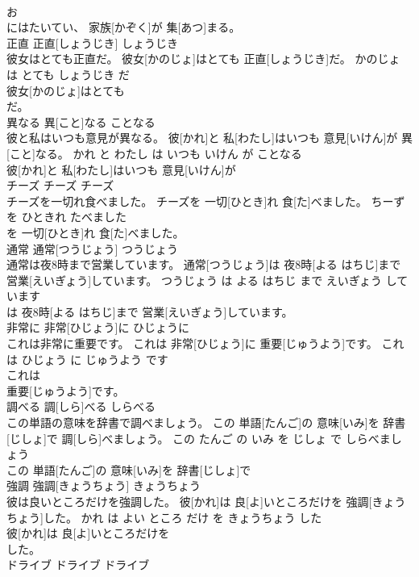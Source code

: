 \documentclass[8pt]{extreport}
\begin{document}
\begin{CJK}{UTF8}{min}
\\	お
\\	にはたいてい、 家族[かぞく]が 集[あつ]まる。		
\\	正直	正直[しょうじき]	しょうじき	
\\	彼女はとても正直だ。	彼女[かのじょ]はとても 正直[しょうじき]だ。	かのじょ は とても しょうじき だ	
\\	彼女[かのじょ]はとても
\\	だ。		
\\	異なる	異[こと]なる	ことなる	
\\	彼と私はいつも意見が異なる。	彼[かれ]と 私[わたし]はいつも 意見[いけん]が 異[こと]なる。	かれ と わたし は いつも いけん が ことなる	
\\	彼[かれ]と 私[わたし]はいつも 意見[いけん]が
\\	チーズ	チーズ	チーズ	
\\	チーズを一切れ食べました。	チーズを 一切[ひとき]れ 食[た]べました。	ちーず を ひときれ たべました	
\\	を 一切[ひとき]れ 食[た]べました。		
\\	通常	通常[つうじょう]	つうじょう	
\\	通常は夜8時まで営業しています。	通常[つうじょう]は 夜8時[よる はちじ]まで 営業[えいぎょう]しています。	つうじょう は よる はちじ まで えいぎょう して います	
\\	は 夜8時[よる はちじ]まで 営業[えいぎょう]しています。		
\\	非常に	非常[ひじょう]に	ひじょうに	
\\	これは非常に重要です。	これは 非常[ひじょう]に 重要[じゅうよう]です。	これ は ひじょう に じゅうよう です	
\\	これは
\\	重要[じゅうよう]です。		
\\	調べる	調[しら]べる	しらべる	
\\	この単語の意味を辞書で調べましょう。	この 単語[たんご]の 意味[いみ]を 辞書[じしょ]で 調[しら]べましょう。	この たんご の いみ を じしょ で しらべましょう	
\\	この 単語[たんご]の 意味[いみ]を 辞書[じしょ]で
\\	強調	強調[きょうちょう]	きょうちょう	
\\	彼は良いところだけを強調した。	彼[かれ]は 良[よ]いところだけを 強調[きょうちょう]した。	かれ は よい ところ だけ を きょうちょう した	
\\	彼[かれ]は 良[よ]いところだけを
\\	した。		
\\	ドライブ	ドライブ	ドライブ	

\end{CJK}
\end{document}
